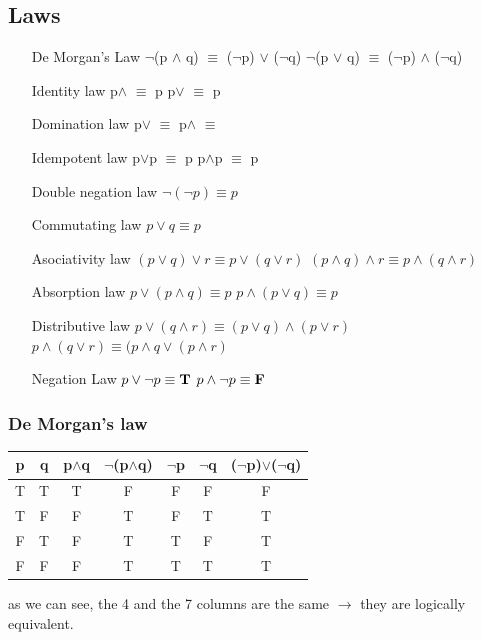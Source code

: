 \documentclass[12pt,a4paper]{article}
\begin{document}
\subsection{Laws}
\begin{itemize}
	\item[De Morgan's Law] $\neg$(p $\wedge$ q) $\equiv$ ($\neg$p) $\vee$ ($\neg$q)
	\newline $\neg$(p $\vee$ q) $\equiv$ ($\neg$p) $\wedge$ ($\neg$q)

	\item[Identity law] p$\wedge$ $\equiv$ p
	\newline p$\vee$ $\equiv$ p

	\item[Domination law] p$\vee$ $\equiv$ 
	\newline p$\wedge$ $\equiv$ 

	\item[Idempotent law] p$\vee$p $\equiv$ p
	\newline p$\wedge$p $\equiv$ p

	\item[Double negation law] $\neg(\neg p) \equiv p$

	\item[Commutating law] $p \vee q \equiv p$
	
	\item[Asociativity law] $(p \vee q) \vee r \equiv p \vee (q \vee r)$
	\newline$(p \wedge q) \wedge r \equiv p \wedge (q \wedge r)$
	
	\item[Absorption law]$p \vee (p \wedge q) \equiv p$
	\newline $p \wedge (p \vee q) \equiv p$
	
	\item[Distributive law]$p \vee (q \wedge r) \equiv (p \vee q) \wedge (p \vee r)$
	\newline $p \wedge (q \vee r) \equiv (p \wedge q \vee (p \wedge r)$
	
	\item[Negation Law] $p \vee \neg p \equiv \textbf{T}$
	\newline $p \wedge \neg p \equiv \textbf{F}$
\end{itemize}
\subsubsection{De Morgan's law}
\begin{center}
	\begin{tabular}{cc|ccccc}
		p & q & p$\wedge$q & $\neg$(p$\wedge$q) & $\neg$p & $\neg$q & 			($\neg$p)$\vee$($\neg$q)\\
		\hline
		T&T&T&F&F&F&F\\
		T&F&F&T&F&T&T\\
		F&T&F&T&T&F&T\\
		F&F&F&T&T&T&T\\
	\end{tabular}
\end{center}
as we can see, the 4 and the 7 columns are the same $\rightarrow$ they are logically equivalent.
\end{document}
